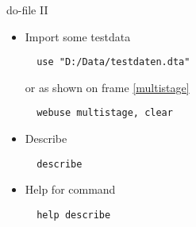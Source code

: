 \begin{frame}[fragile]{do-file II}
 \begin{itemize}
  \item Import some testdata  

  \begin{lstlisting}
  use "D:/Data/testdaten.dta"
  \end{lstlisting}
  
  or as shown on frame \ref{multistage}
  
  \begin{lstlisting}   
  webuse multistage, clear
  \end{lstlisting}


  \item Describe 
  
  \begin{lstlisting}
  describe
  \end{lstlisting}
 
  \item Help for command 
  \begin{lstlisting}
  help describe
  \end{lstlisting}

 \end{itemize}
\end{frame}

